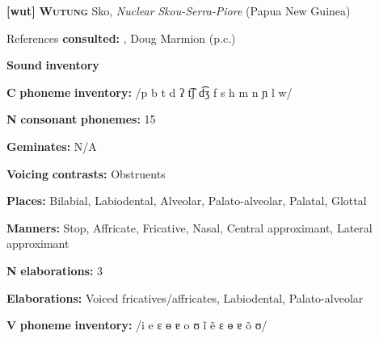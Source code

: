 \begin{styleBody}
\textbf{[wut]}   \textbf{\textsc{Wutung}}  Sko, \textit{Nuclear} \textit{Skou-Serra-Piore} (Papua New Guinea)
\end{styleBody}

\begin{styleBody}
References \textbf{consulted:} \citet{Marmion2010}, Doug Marmion (p.c.)
\end{styleBody}

\begin{styleBody}
\textbf{Sound} \textbf{inventory}
\end{styleBody}

\begin{styleBody}
\textbf{C} \textbf{phoneme} \textbf{inventory:} /p b t d ʔ t͡ʃ d͡ʒ f s h m n ɲ l w/
\end{styleBody}

\begin{styleBody}
\textbf{N} \textbf{consonant} \textbf{phonemes:} 15
\end{styleBody}

\begin{styleBody}
\textbf{Geminates:} N/A
\end{styleBody}

\begin{styleBody}
\textbf{Voicing} \textbf{contrasts:} Obstruents
\end{styleBody}

\begin{styleBody}
\textbf{Places:} Bilabial, Labiodental, Alveolar, Palato-alveolar, Palatal, Glottal
\end{styleBody}

\begin{styleBody}
\textbf{Manners:} Stop, Affricate, Fricative, Nasal, Central approximant, Lateral approximant
\end{styleBody}

\begin{styleBody}
\textbf{N} \textbf{elaborations:} 3
\end{styleBody}

\begin{styleBody}
\textbf{Elaborations:} Voiced fricatives/affricates, Labiodental, Palato-alveolar
\end{styleBody}

\begin{styleBody}
\textbf{V} \textbf{phoneme} \textbf{inventory:} /i e ɛ ɵ ɐ o ʊ ĩ ẽ ɛ ɵ ɐ õ ʊ/
\end{styleBody}

